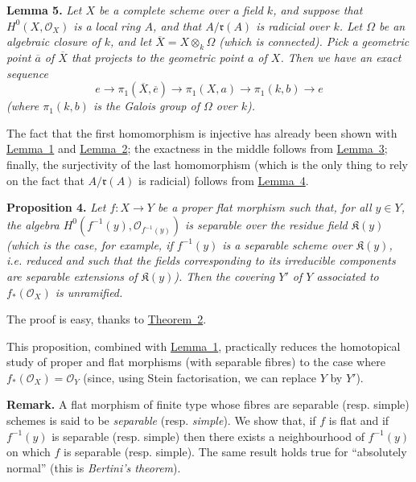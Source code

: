 \documentclass{article}
\newenvironment{itenv}[1]
  {\phantomsection\par\medskip\noindent\textbf{#1.}\itshape}
  {\par\medskip}
\newenvironment{rmenv}[1]
  {\phantomsection\par\medskip\noindent\textbf{#1.}\rmfamily}
  {\par\medskip}
\newcommand{\scr}[1]{{\mathscr{#1}}}
\newcommand{\fk}{\mathfrak}
\newcommand{\kres}{\mathfrak{K}}
\newcommand{\oldpage}[1]{\marginpar{\footnotesize$\Big\vert$ \textit{p.~#1}}}
\begin{document}
\begin{itenv}{Lemma 5}
\label{lemma5}
  Let $X$ be a complete scheme over a field $k$, and suppose that $H^0(X,\scr{O}_X)$ is a local ring $A$, and that $A/\fk{r}(A)$ is radicial over $k$.
  Let $\Omega$ be an algebraic closure of $k$, and let $\overline{X}=X\otimes_k\Omega$ (which is connected).
  Pick a geometric point $\overline{a}$ of $\overline{X}$ that projects to the geometric point $a$ of $X$.
  Then we have an exact sequence
  \[
    e
    \to \pi_1(\overline{X},\overline{e})
    \to \pi_1(X,a)
    \to \pi_1(k,b)
    \to e
  \]
  (where $\pi_1(k,b)$ is the Galois group of $\Omega$ over $k$).
\end{itenv}

The fact that the first homomorphism is injective has already been shown with \hyperref[lemma1]{Lemma~1} and \hyperref[lemma2]{Lemma~2};
the exactness in the middle follows from \hyperref[lemma3]{Lemma~3};
finally, the surjectivity of the last homomorphism (which is the only thing to rely on the fact that $A/\fk{r}(A)$ is radicial) follows from \hyperref[lemma4]{Lemma~4}.

\begin{itenv}{Proposition 4}
\label{proposition4}
  Let $f\colon X\to Y$ be a proper flat morphism such that, for all $y\in Y$, the algebra $H^0(f^{-1}(y),\scr{O}_{f^{-1}(y)})$ is separable over the residue field $\kres(y)$ (which is the case, for example, if $f^{-1}(y)$ is a \emph{separable scheme} over $\kres(y)$, i.e. reduced and such that the fields corresponding to its irreducible components are separable extensions of $\kres(y)$).
  Then the covering
\oldpage{182-21}
  $Y'$ of $Y$ associated to $f_*(\scr{O}_X)$ is unramified.
\end{itenv}

The proof is easy, thanks to \hyperref[theorem2]{Theorem~2}.

This proposition, combined with \hyperref[lemma1]{Lemma~1}, practically reduces the homotopical study of proper and flat morphisms (with separable fibres) to the case where $f_*(\scr{O}_X)=\scr{O}_Y$ (since, using Stein factorisation, we can replace $Y$ by $Y'$).

\begin{rmenv}{Remark}
  A flat morphism of finite type whose fibres are separable (resp. simple) schemes is said to be \emph{separable} (resp. \emph{simple}).
  We show that, if $f$ is flat and if $f^{-1}(y)$ is separable (resp. simple) then there exists a neighbourhood of $f^{-1}(y)$ on which $f$ is separable (resp. simple).
  The same result holds true for ``absolutely normal'' (this is \emph{Bertini's theorem}).
\end{rmenv}
\end{document}
